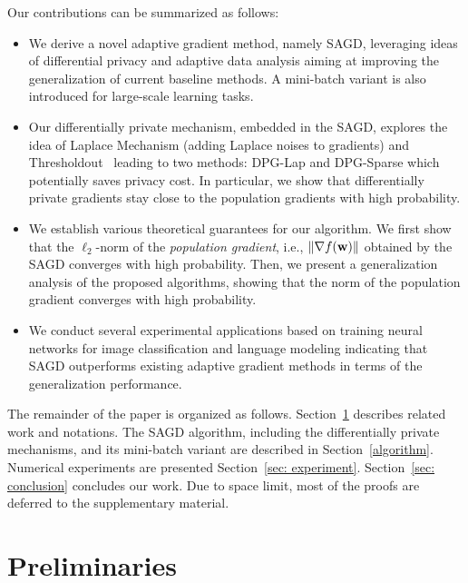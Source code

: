 \documentclass[11pt]{article}
\begin{document}
Our  contributions  can be summarized as follows:
\begin{itemize}
\item We derive a novel adaptive gradient method, namely \textsc{SAGD}, leveraging ideas of differential privacy and adaptive data analysis aiming at improving the generalization of current baseline methods. A mini-batch variant is also introduced for large-scale learning tasks.
\item Our differentially private mechanism, embedded in the \textsc{SAGD}, explores the idea of Laplace Mechanism (adding Laplace noises to gradients) and Thresholdout~\citep{dwro2014} leading to two methods: DPG-Lap and DPG-Sparse which potentially saves privacy cost. In particular, we show that differentially private gradients stay close to the population gradients with high probability. 
\item We establish various theoretical guarantees for our algorithm. We first show that the $\ell_2$-norm of the \emph{population gradient}, i.e., $\|\nabla f(\mathbf{w})\|$ obtained by the \textsc{SAGD} converges with high probability. Then, we present a generalization analysis of the proposed algorithms, showing that the norm of the population gradient converges with high probability.
\item We conduct several experimental applications based on training neural networks for image classification and language modeling indicating that \textsc{SAGD} outperforms existing adaptive gradient methods in terms of the generalization performance.
\end{itemize}
The remainder of the paper is organized as follows.
Section~\ref{related} describes related work and notations. 
The \textsc{SAGD} algorithm, including the differentially private mechanisms, and its mini-batch variant are described in Section~\ref{algorithm}. 
Numerical experiments are presented Section~\ref{sec: experiment}. 
Section~\ref{sec: conclusion} concludes our work. 
Due to space limit, most of the proofs are deferred to the supplementary material.


\section{Preliminaries}
\label{related}
\end{document}
